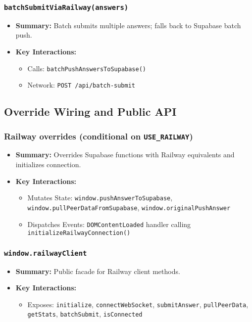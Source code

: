 \documentclass[11pt,letterpaper]{article}
\begin{document}
\subsubsection{\texttt{batchSubmitViaRailway(answers)}}
\begin{itemize}
    \item \textbf{Summary:} Batch submits multiple answers; falls back to Supabase batch push.
    \item \textbf{Key Interactions:}
    \begin{itemize}
        \item Calls: \texttt{batchPushAnswersToSupabase()}
        \item Network: \texttt{POST /api/batch-submit}
    \end{itemize}
\end{itemize}

\subsection{Override Wiring and Public API}

\subsubsection{Railway overrides (conditional on \texttt{USE\_RAILWAY})}
\begin{itemize}
    \item \textbf{Summary:} Overrides Supabase functions with Railway equivalents and initializes connection.
    \item \textbf{Key Interactions:}
    \begin{itemize}
        \item Mutates State: \texttt{window.pushAnswerToSupabase}, \texttt{window.pullPeerDataFromSupabase}, \texttt{window.originalPushAnswer}
        \item Dispatches Events: \texttt{DOMContentLoaded} handler calling \texttt{initializeRailwayConnection()}
    \end{itemize}
\end{itemize}

\subsubsection{\texttt{window.railwayClient}}
\begin{itemize}
    \item \textbf{Summary:} Public facade for Railway client methods.
    \item \textbf{Key Interactions:}
    \begin{itemize}
        \item Exposes: \texttt{initialize}, \texttt{connectWebSocket}, \texttt{submitAnswer}, \texttt{pullPeerData}, \texttt{getStats}, \texttt{batchSubmit}, \texttt{isConnected}
    \end{itemize}
\end{itemize}
\end{document}
